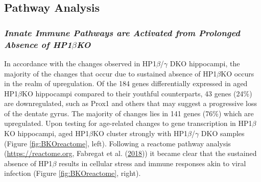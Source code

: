\documentclass[onehalf,12pt]{beavtex}
\begin{document}
  \subsection{Pathway Analysis}\label{pathway-analysis}
  
  \subsubsection*{\texorpdfstring{\emph{Innate Immune Pathways are
  Activated from Prolonged Absence of
  HP1\(\beta\)KO}}{Innate Immune Pathways are Activated from Prolonged Absence of HP1\textbackslash{}betaKO}}\label{innate-immune-pathways-are-activated-from-prolonged-absence-of-hp1betako}
  
  In accordance with the changes observed in HP1\(\beta\)/\(\gamma\) DKO
  hippocampi, the majority of the changes that occur due to sustained
  absence of HP1\(\beta\)KO occurs in the realm of upregulation. Of the
  184 genes differentially expressed in aged HP1\(\beta\)KO hippocampi
  compared to their youthful counterparts, 43 genes (24\%) are
  downregulated, such as Prox1 and others that may suggest a progressive
  loss of the dentate gyrus. The majority of changes lies in 141 genes
  (76\%) which are upregulated. Upon testing for age-related changes to
  gene transcription in HP1\(\beta\)KO hippocampi, aged HP1\(\beta\)KO
  cluster strongly with HP1\(\beta\)/\(\gamma\) DKO samples (Figure
  \ref{fig:BKOreactome}, left). Following a reactome pathway analysis
  (\url{https://reactome.org}, Fabregat et al.
  (\protect\hyperlink{ref-FabregatReactomePathwayKnowledgebase2018}{2018}))
  it became clear that the sustained absence of HP1\(\beta\) results in
  cellular stress and immune responses akin to viral infection (Figure
  \ref{fig:BKOreactome}, right).
  
\end{document}
